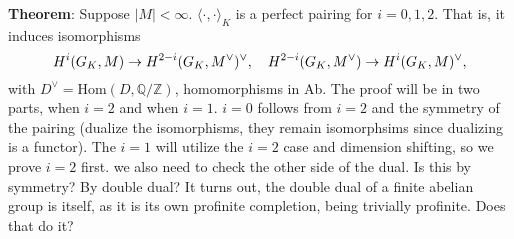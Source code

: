 \documentclass[class=article, crop=false]{standalone}
\begin{document}

\textbf{Theorem}: Suppose $|M|<\infty$. $\langle \cdot, \cdot \rangle_K$ is a perfect pairing for $i=0,1,2$. 
\vskip 3pt That is, it induces isomorphisms \[H^i(G_K,M) \to H^{2-i}(G_K, M^{\vee})^{\vee}, \quad  H^{2-i}(G_K,M^{\vee}) \to H^i(G_K, M)^{\vee},\]
with $D^{\vee} = \text{Hom}(D, \mathbb{Q}/\mathbb{Z})$, homomorphisms in Ab.
\vskip 5pt
The proof will be in two parts, when $i=2$ and when $i=1$. 
$i=0$ follows from $i=2$ and the symmetry of the pairing 
(dualize the isomorphisms, they remain isomorphsims since
dualizing is a functor). 
The $i=1$ will utilize the $i=2$ case and dimension shifting, so we prove $i=2$ first.
{\color{red} we also need to check the other side of the dual.
Is this by symmetry? By double dual?
It turns out, the double dual of a finite abelian group
is itself, as it is its own profinite completion, being
trivially profinite. Does that do it?}
\end{document}
